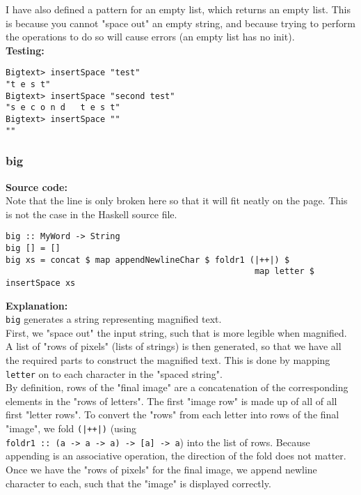\documentclass[11pt]{article}
\begin{document}
I have also defined a pattern for an empty list, which returns an empty list. This is because you cannot "space out" an empty string, and because trying to perform the operations to do so will cause errors (an empty list has no init).\\

\textbf{Testing:}
\begin{verbatim}
Bigtext> insertSpace "test"
"t e s t"
Bigtext> insertSpace "second test"
"s e c o n d   t e s t"
Bigtext> insertSpace ""
""
\end{verbatim}

\newpage
\subsubsection{big}
\textbf{Source code:}\\
Note that the line is only broken here so that it will fit neatly on the page. This is not the case in the Haskell source file.
\begin{verbatim}
big :: MyWord -> String
big [] = []                                                                          
big xs = concat $ map appendNewlineChar $ foldr1 (|++|) $ 
                                                  map letter $ insertSpace xs
\end{verbatim}

\textbf{Explanation:}\\
{\verb|big|} generates a string representing magnified text. \\

First, we "space out" the input string, such that is more legible when magnified. A list of "rows of pixels" (lists of strings) is then generated, so that we have all the required parts to construct the magnified text. This is done by mapping {\verb|letter|} on to each character in the "spaced string". \\

By definition, rows of the "final image" are a concatenation of the corresponding elements in the "rows of letters". The first "image row" is made up of all of all first "letter rows". To convert the "rows" from each letter into rows of the final "image", we fold {\verb=(|++|)=} (using\\ {\verb|foldr1 :: (a -> a -> a) -> [a] -> a|})   into the list of rows. Because appending is an associative operation, the direction of the fold does not matter. Once we have the "rows of pixels" for the final image, we append newline character to each, such that the "image" is displayed correctly. \\
\end{document}
